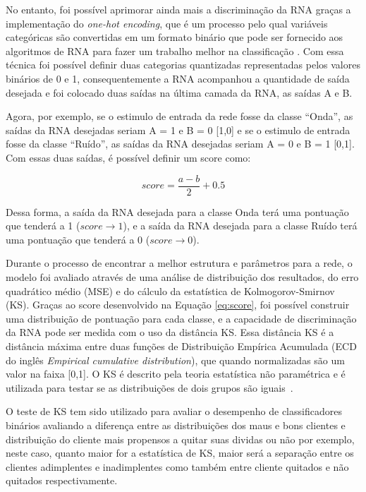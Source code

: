 No entanto, foi possível aprimorar ainda mais a discriminação da RNA graças a implementação do \textit{one-hot encoding}, que é um processo pelo qual variáveis categóricas são convertidas em um formato binário que pode ser fornecido aos algoritmos de RNA para fazer um trabalho melhor na classificação \cite{buckman2018thermometer}. Com essa técnica foi possível definir duas categorias quantizadas representadas pelos valores binários de 0 e 1, consequentemente a RNA acompanhou a quantidade de saída desejada e foi colocado duas saídas na última camada da RNA, as saídas A e B. 

Agora, por exemplo, se o estimulo de entrada da rede fosse da classe ``Onda'', as saídas da RNA desejadas seriam A = 1 e B = 0 [1,0] e se o estimulo de entrada fosse da classe ``Ruído'', as saídas da RNA desejadas seriam A = 0 e B = 1 [0,1]. Com essas duas saídas, é possível definir um score como:

\begin{equation}
score = \frac{a-b}{2}+0.5
\label{eq:score}
\end{equation}

Dessa forma, a saída da RNA desejada para a classe Onda terá uma pontuação que tenderá a 1 ($score \rightarrow 1$), e a saída da RNA desejada para a classe Ruído terá uma pontuação que tenderá a 0 ($score \rightarrow 0$). 

Durante o processo de encontrar a melhor estrutura e parâmetros para a rede, o modelo foi avaliado através de uma análise de distribuição dos resultados, do erro quadrático médio (MSE) e do cálculo da estatística de Kolmogorov-Smirnov (KS). Graças ao score desenvolvido na Equação \ref{eq:score}, foi possível construir uma distribuição de pontuação para cada classe, e a capacidade de discriminação da RNA pode ser medida com o uso da distância KS. Essa distância KS é a distância máxima entre duas funções de Distribuição Empírica Acumulada (ECD do inglês \textit{Empirical cumulative distribution}), que quando normalizadas são um valor na faixa [0,1]. O KS é descrito pela teoria estatística não paramétrica e é utilizada para testar se as distribuições de dois grupos são iguais~\cite{daniel2000applied}. 

O teste de KS tem sido utilizado para avaliar o desempenho de classificadores binários avaliando a diferença entre as distribuições dos maus e bons clientes \cite{karcher2009redes} e distribuição do cliente mais propensos a quitar suas dividas ou não \cite{forti2018tecnicas}  por exemplo, neste caso, quanto maior for a estatística de KS, maior será a separação entre os clientes adimplentes e inadimplentes como também entre cliente quitados e não quitados respectivamente. 


